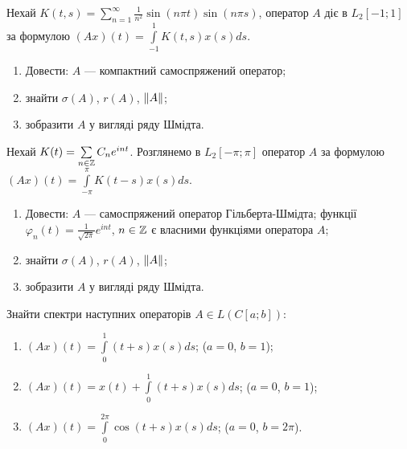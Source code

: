
\begin{exercise}
    Нехай $K(t,s) = \sum\limits^\infty_{n=1} \frac{1}{n^2} \sin(n \pi t) \sin(n \pi s)$,
    оператор $A$ діє в $L_2[-1;1]$ за формулою $(Ax)(t) = \int\limits^1_{-1} K(t,s) x(s) ds$.
    \begin{enumerate}
        \item Довести: $A$ --- компактний самоспряжений оператор;
        \item знайти $\sigma(A)$, $r(A)$, $\left\lVert A\right\rVert$;
        \item зобразити $A$ у вигляді ряду Шмідта.
    \end{enumerate}
\end{exercise}

\begin{exercise}
    Нехай $K(t) = \sum\limits_{n \in \mathbb{Z}} C_n e^{i n t}$. Розглянемо в $L_2[-\pi; \pi]$
    оператор $A$ за формулою $(Ax)(t) = \int\limits^\pi_{-\pi} K(t-s) x(s) ds$.
    \begin{enumerate}
        \item Довести: $A$ --- самоспряжений оператор Гільберта-Шмідта; функції \\$\varphi_n(t) = 
        \frac{1}{\sqrt{2\pi}} e^{i n t}$, $n \in \mathbb{Z}$ є власними функціями оператора $A$;
        \item знайти $\sigma(A)$, $r(A)$, $\left\lVert A\right\rVert$;
        \item зобразити $A$ у вигляді ряду Шмідта.
    \end{enumerate}
\end{exercise}

\begin{exercise}
    Знайти спектри наступних операторів $A \in L(C[a;b])$:
    \begin{enumerate}
        \item $(Ax)(t) = \int\limits^1_0 (t+s)x(s)ds$; ($a=0$, $b=1$);
        \item $(Ax)(t) = x(t) + \int\limits^1_0 (t+s)x(s)ds$; ($a=0$, $b=1$);
        \item $(Ax)(t) = \int\limits^{2\pi}_0 \cos(t+s)x(s)ds$; ($a=0$, $b=2\pi$).
    \end{enumerate}
\end{exercise}

